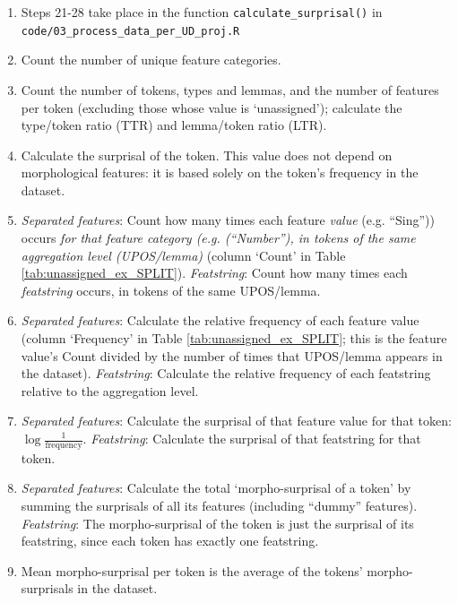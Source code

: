 \documentclass[USenglish]{article}
\begin{document}
\begin{enumerate}
 \item[] \hspace*{-\leftmargin} Steps 21-28 take place in the function \texttt{calculate\_surprisal()} in \newline\texttt{code/03\_process\_data\_per\_UD\_proj.R}
\item Count the number of unique feature categories.
\item Count the number of tokens, types and lemmas, and the number of features per token (excluding those whose value is `unassigned'); calculate the type/token ratio (TTR) and lemma/token ratio (LTR).
\item Calculate the surprisal of the token. This value does not depend on morphological features: it is based solely on the token's frequency in the dataset.
\item \textit{Separated features}: Count how many times each feature \textit{value} (e.g. ``Sing'')) occurs \textit{for that feature category (e.g. (``Number''), in tokens of the same aggregation level (UPOS/lemma)} (column `Count' in Table \ref{tab:unassigned_ex_SPLIT}). \textit{Featstring}: Count how many times each \textit{featstring} occurs, in tokens of the same UPOS/lemma.
\item \textit{Separated features}: Calculate the relative frequency of each feature value (column `Frequency' in Table \ref{tab:unassigned_ex_SPLIT}; this is the feature value's Count divided by the number of times that UPOS/lemma appears in the dataset). \textit{Featstring}: Calculate the relative frequency of each featstring relative to the aggregation level.
\item \textit{Separated features}: Calculate the surprisal of that feature value for that token: $\log{\frac{1}{\text{frequency}}}$. \textit{Featstring}: Calculate the surprisal of that featstring for that token.
\item \textit{Separated features}: Calculate the total `morpho-surprisal of a token' by summing the surprisals of all its features (including ``dummy'' features). \textit{Featstring}: The morpho-surprisal of the token is just the surprisal of its featstring, since each token has exactly one featstring.
\item Mean morpho-surprisal per token is the average of the tokens' morpho-surprisals in the dataset.\\


\end{enumerate}
\end{document}

